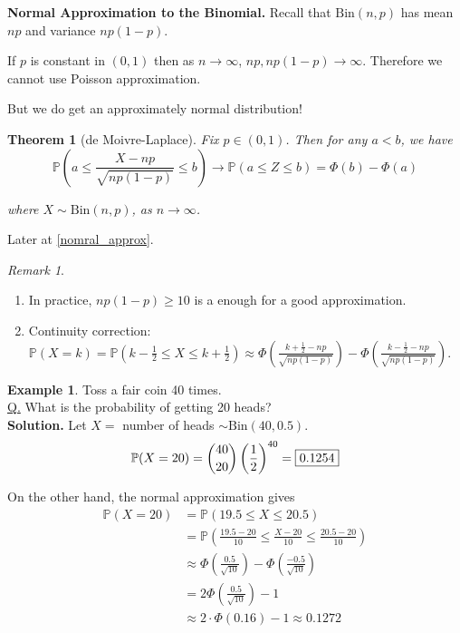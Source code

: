 \documentclass[a4paper,11pt]{amsbook}
\makeatletter
\renewenvironment{proof}[1][\proofname]{\par
    \pushQED{\qed}%
    \normalfont \topsep6\p@\@plus6\p@\relax
    \trivlist
    \itemindent\z@ %
    \item[\hskip\labelsep
          \scshape
      #1\@addpunct{.}]\ignorespaces
}{%
    \popQED\endtrivlist\@endpefalse
}
\newtheorem{theorem}{\hspace{-2em} \color{darkblue} Theorem}[chapter]
\theoremstyle{definition}
\newtheorem{example}{\hspace{-2em} \color{darkblue} Example}[chapter]
\theoremstyle{remark}
\newtheorem{remark}{\hspace{-2em} \color{darkblue} Remark}[chapter]
\renewcommand{\P}{\mathbb{P}}
\newcommand\0{\varnothing}
\newcommand\Bin{\text{Bin}}
\makeatother
\begin{document}
    \textbf{Normal Approximation to the Binomial.} 
    Recall that $\Bin(n,p)$ has mean $np$ and variance $np(1-p)$.

    If $p$ is constant in $(0,1)$ then as $n\to\infty$, $np,np(1-p)\to\infty$.
    Therefore we cannot use Poisson approximation.

    But we do get an approximately normal distribution!

    \begin{theorem}[de Moivre-Laplace]
        Fix $p\in(0,1)$. Then for any $a<b$, we have $$\P\left(a\leq\frac{X-np}{\sqrt{np(1-p)}}\leq b\right)
        \to\P(a\leq Z\leq b)=\Phi(b)-\Phi(a)$$

        where $X\sim\Bin(n,p)$, as $n\to\infty$.
    \end{theorem}
    \begin{proof}
        Later at \ref{nomral_approx}.
    \end{proof}
    
    \begin{remark} 
        \begin{enumerate}
            \item In practice, $np(1-p)\geq 10$ is a enough for a good approximation.
            \item Continuity correction: $\P(X=k)=\P\left(k-\frac12\leq X\leq k+\frac12\right)
            \approx\Phi\left(\frac{k+\frac12-np}{\sqrt{np(1-p)}}\right)-\Phi\left(\frac{k-\frac12-np}{\sqrt{np(1-p)}}\right)$.
        \end{enumerate}
    \end{remark}

    \begin{example}
        Toss a fair coin 40 times.\\
        \underline{Q.} What is the probability of getting 20 heads?\\
        \textbf{Solution.} Let $X=$ number of heads $\sim\Bin(40,0.5)$.\\
        $$\P(X=20)=\binom{40}{20}\left(\frac12\right)^{40}=\fbox{0.1254}$$

        On the other hand, the normal approximation gives
        \begin{align*}
            \P(X=20)&=\P(19.5\leq X\leq 20.5) \\
            &=\P\left(\frac{19.5-20}{10}\leq\frac{X-20}{10}\leq\frac{20.5-20}{10}\right) \\
            &\approx\Phi\left(\frac{0.5}{\sqrt{10}}\right)-\Phi\left(\frac{-0.5}{\sqrt{10}}\right) \\
            &=2\Phi\left(\frac{0.5}{\sqrt{10}}\right)-1 \\
            &\approx2\cdot\Phi(0.16)-1\approx0.1272
        \end{align*}
    \end{example}
\end{document}
